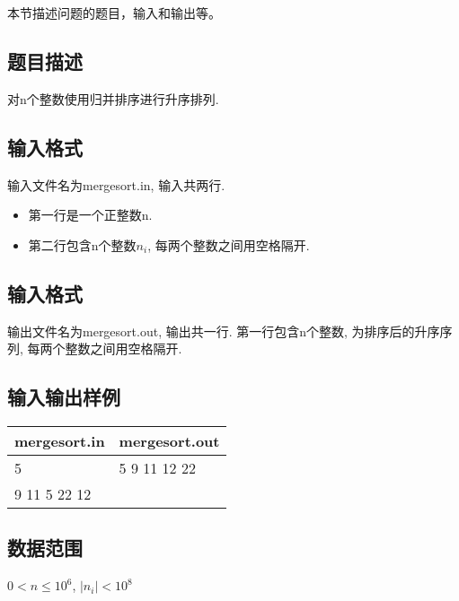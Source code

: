 本节描述问题的题目，输入和输出等。
\subsection{题目描述}
对n个整数使用归并排序进行升序排列.
\subsection{输入格式}
输入文件名为mergesort.in, 输入共两行.
\begin{itemize}
	\item 第一行是一个正整数n.
	\item 第二行包含n个整数$n_i$, 每两个整数之间用空格隔开.
\end{itemize}
\subsection{输入格式}
输出文件名为mergesort.out, 输出共一行.
第一行包含n个整数, 为排序后的升序序列, 每两个整数之间用空格隔开.
\subsection{输入输出样例}
\begin{table}[h!]
	\centering
	\begin{tabular}{|l|l|}
		\hline
		mergesort.in & mergesort.out \\
		\hline
		5            & 5 9 11 12 22  \\
		9 11 5 22 12 & ~             \\
		\hline
	\end{tabular}
\end{table}
\subsection{数据范围}
$ 0 < n \leq 10^6 $,
$ | n_i | < 10^8 $
